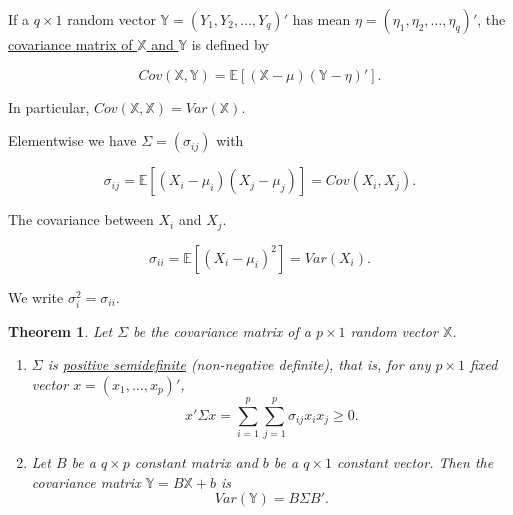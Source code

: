 \documentclass[twoside]{article}
\newcounter{lecnum}
\newtheorem{theorem}{Theorem}[lecnum]
\begin{document}
If a $q\times 1$ random vector $\mathbb{Y}=(Y_1,Y_2,\dots,Y_q)'$ has mean $\eta=(\eta_1,\eta_2,\dots,\eta_q)'$, the \underline{covariance matrix of $\mathbb{X}$ and $\mathbb{Y}$} is defined by

$$Cov(\mathbb{X},\mathbb{Y})=\mathbb{E}\left[(\mathbb{X}-\mu)(\mathbb{Y}-\eta)'\right].$$

In particular, $Cov(\mathbb{X},\mathbb{X})=Var(\mathbb{X}).$

Elementwise we have $\Sigma=(\sigma_{ij})$ with

$$\sigma_{ij}=\mathbb{E}\left[(X_i-\mu_i)(X_j-\mu_j)\right]=Cov(X_i,X_j).$$

The covariance between $X_i$ and $X_j$.

$$\sigma_{ii}=\mathbb{E}[(X_i-\mu_i)^2]=Var(X_i).$$

We write $\sigma_i^2=\sigma_{ii}.$

\begin{theorem}
	Let $\Sigma$ be the covariance matrix of a $p\times 1$ random vector $\mathbb{X}$.
	
	\begin{enumerate}
		\item $\Sigma$ is \underline{positive semidefinite} (non-negative definite), that is, for any $p\times 1$ fixed vector $x=(x_1,\dots,x_p)'$, $$x'\Sigma x=\sum^p_{i=1}\sum^p_{j=1}\sigma_{ij}x_ix_j\geq 0.$$
		\item Let $B$ be a $q\times p$ constant matrix and $b$ be a $q\times 1$ constant vector. Then the covariance matrix $\mathbb{Y}=B\mathbb{X}+b$ is $$Var(\mathbb{Y})=B\Sigma B'.$$
	\end{enumerate}
\end{theorem}
\end{document}
